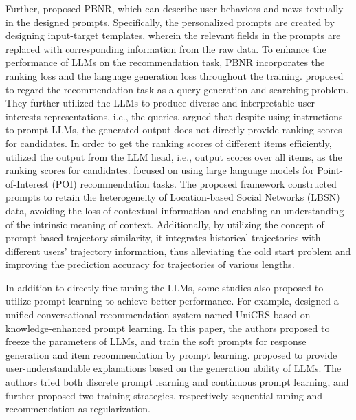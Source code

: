 \documentclass[sn-mathphys-num]{sn-jnl}%
\theoremstyle{thmstyleone}%
\theoremstyle{thmstyletwo}%
\theoremstyle{thmstylethree}%
\begin{document}
Further, \cite{li2023pbnr} proposed PBNR, which can describe user behaviors and news textually in the designed prompts. Specifically, the personalized prompts are created by designing input-target templates, wherein the relevant fields in the prompts are replaced with corresponding information from the raw data. To enhance the performance of LLMs on the recommendation task, PBNR incorporates the ranking loss and the language generation loss throughout the training. 
\cite{li2023gpt4rec} proposed to regard the recommendation task as a query generation and searching problem. They further utilized the LLMs to produce diverse and interpretable user interests representations, i.e., the queries. \cite{yue2023llamarec} argued that despite using instructions to prompt LLMs, the generated output does not directly provide ranking scores for candidates. In order to get the ranking scores of different items efficiently, \cite{yue2023llamarec} utilized the output from the LLM head, i.e., output scores over all items, as the ranking scores for candidates. \cite{li2024large} focused on using large language models for Point-of-Interest (POI) recommendation tasks.  The proposed framework constructed prompts to retain the heterogeneity of Location-based Social Networks (LBSN) data, avoiding the loss of contextual information and enabling an understanding of the intrinsic meaning of context. Additionally, by utilizing the concept of prompt-based trajectory similarity, it integrates historical trajectories with different users' trajectory information, thus alleviating the cold start problem and improving the prediction accuracy for trajectories of various lengths. 


In addition to directly fine-tuning the LLMs, some studies also proposed to utilize prompt learning to achieve better performance. For example, \cite{DBLP:conf/kdd/WangZWZ22} designed a unified conversational recommendation system named UniCRS based on knowledge-enhanced prompt learning. In this paper, the authors proposed to freeze the parameters of LLMs, and train the soft prompts for response generation and item recommendation by prompt learning. \cite{li2023personalized} proposed to provide user-understandable explanations based on the generation ability of LLMs. The authors tried both discrete prompt learning and continuous prompt learning, and further proposed two training strategies, respectively sequential tuning and recommendation as regularization.
\end{document}
